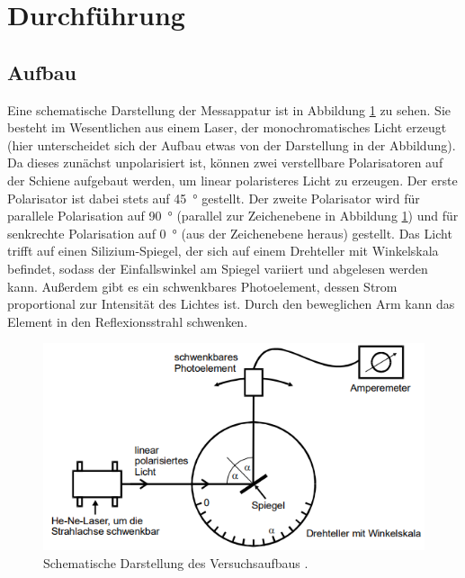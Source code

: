 \section{Durchführung}

\subsection{Aufbau}
Eine schematische Darstellung der Messappatur ist in Abbildung \ref{fig:aufbau} zu sehen.
Sie besteht im Wesentlichen aus einem Laser, der monochromatisches Licht erzeugt 
(hier unterscheidet sich der Aufbau etwas von der Darstellung in der Abbildung).
Da dieses zunächst unpolarisiert ist, können zwei verstellbare Polarisatoren auf der Schiene aufgebaut werden, um linear polaristeres 
Licht zu erzeugen.
Der erste Polarisator ist dabei stets auf \qty{45}{\degree} gestellt.
Der zweite Polarisator wird für parallele Polarisation auf \qty{90}{\degree} (parallel zur Zeichenebene in Abbildung \ref{fig:aufbau})
und für senkrechte Polarisation auf \qty{0}{\degree} (aus der Zeichenebene heraus) gestellt.
Das Licht trifft auf einen Silizium-Spiegel, der sich auf einem Drehteller mit Winkelskala befindet, sodass der Einfallswinkel
am Spiegel variiert und abgelesen werden kann.
Außerdem gibt es ein schwenkbares Photoelement, dessen Strom proportional zur Intensität des Lichtes ist.
Durch den beweglichen Arm kann das Element in den Reflexionsstrahl schwenken.

\begin{figure}[H]
    \centering
    \includegraphics[height = 5.5 cm]{Abbildungen/aufbau.png}
    \caption{Schematische Darstellung des Versuchsaufbaus \cite{man:v407}.}
    \label{fig:aufbau}
\end{figure}


